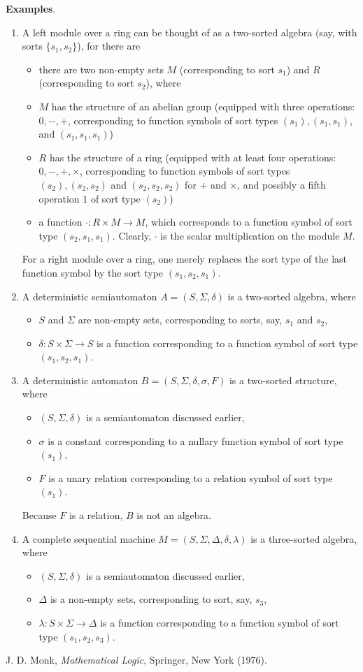 \documentclass[12pt]{article}
\begin{document}
\textbf{Examples}. 
\begin{enumerate}
\item 
A left module over a ring can be thought of as a two-sorted algebra (say, with sorts $\lbrace s_1,s_2\rbrace$), for there are
\begin{itemize}
\item there are two non-empty sets $M$ (corresponding to sort $s_1$) and $R$ (corresponding to sort $s_2$), where
\item $M$ has the structure of an abelian group (equipped with three operations: $0,-,+$, corresponding to function symbols of sort types $(s_1), (s_1,s_1)$, and $(s_1,s_1,s_1)$)
\item $R$ has the structure of a ring (equipped with at least four operations: $0,-,+,\times$, corresponding to function symbols of sort types $(s_2), (s_2,s_2)$ and $(s_2,s_2,s_2)$ for $+$ and $\times$, and possibly a fifth operation $1$ of sort type $(s_2)$)
\item a function $\cdot: R\times M\to M$, which corresponds to a function symbol of sort type $(s_2,s_1,s_1)$.  Clearly, $\cdot$ is the scalar multiplication on the module $M$.
\end{itemize}
For a right module over a ring, one merely replaces the sort type of the last function symbol by the sort type $(s_1,s_2,s_1)$.
\item
A deterministic semiautomaton $A=(S,\Sigma,\delta)$ is a two-sorted algebra, where 
\begin{itemize}
\item $S$ and $\Sigma$ are non-empty sets, corresponding to sorts, say, $s_1$ and $s_2$,
\item $\delta: S\times \Sigma \to S$ is a function corresponding to a function symbol of sort type $(s_1,s_2,s_1)$.  
\end{itemize}
\item
A deterministic automaton $B=(S,\Sigma,\delta,\sigma,F)$ is a two-sorted structure, where 
\begin{itemize}
\item $(S,\Sigma,\delta)$ is a semiautomaton discussed earlier,
\item $\sigma$ is a constant corresponding to a nullary function symbol of sort type $(s_1)$,
\item $F$ is a unary relation corresponding to a relation symbol of sort type $(s_1)$.  
\end{itemize}
Because $F$ is a relation, $B$ is not an algebra.
\item
A complete sequential machine $M=(S,\Sigma,\Delta,\delta,\lambda)$ is a three-sorted algebra, where 
\begin{itemize}
\item $(S,\Sigma,\delta)$ is a semiautomaton discussed earlier,
\item $\Delta$ is a non-empty sets, corresponding to sort, say, $s_3$,
\item $\lambda: S\times \Sigma \to \Delta$ is a function corresponding to a function symbol of sort type $(s_1,s_2,s_3)$.
\end{itemize}
\end{enumerate}

\begin{thebibliography}{9}
 J. D. Monk, \emph{Mathematical Logic}, Springer, New York (1976).
\end{thebibliography}
\end{document}

